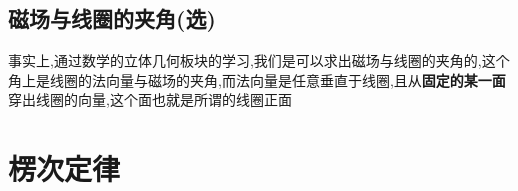\documentclass[a4paper,12pt]{book} %
\begin{document}
\subsection{磁场与线圈的夹角(选)}
事实上,通过数学的立体几何板块的学习,我们是可以求出磁场与线圈的夹角的,这个角上是线圈的法向量与磁场的夹角,而法向量是任意垂直于线圈,且从\textbf{固定的某一面}穿出线圈的向量,这个面也就是所谓的线圈正面

\newpage
\section{楞次定律}
\end{document}
